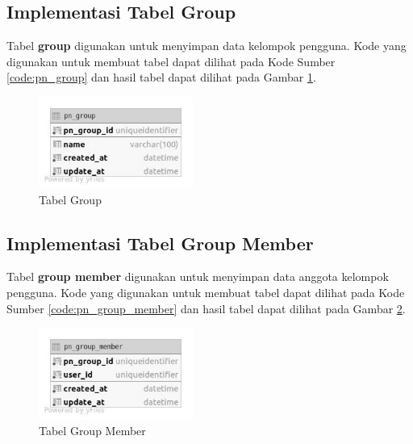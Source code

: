 \subsection{Implementasi Tabel Group}
\par Tabel \textbf{group} digunakan untuk menyimpan data kelompok pengguna. Kode yang digunakan untuk membuat tabel dapat dilihat pada Kode Sumber \ref{code:pn_group} dan hasil tabel dapat dilihat pada Gambar \ref{tabel_pn_group}.

\begin{figure}[H]
    \centering\includegraphics[width=0.45\textwidth]{bab4/figures/tabel_pn_group.jpg}
    \caption{Tabel Group}
    \label{tabel_pn_group}
\end{figure}

\subsection{Implementasi Tabel Group Member}
\par Tabel \textbf{group member} digunakan untuk menyimpan data anggota kelompok pengguna. Kode yang digunakan untuk membuat tabel dapat dilihat pada Kode Sumber \ref{code:pn_group_member} dan hasil tabel dapat dilihat pada Gambar \ref{tabel_pn_group_member}.

\clearpage
\begin{figure}[H]
    \centering\includegraphics[width=0.45\textwidth]{bab4/figures/tabel_pn_group_member.jpg}
    \caption{Tabel Group Member}
    \label{tabel_pn_group_member}
\end{figure}

